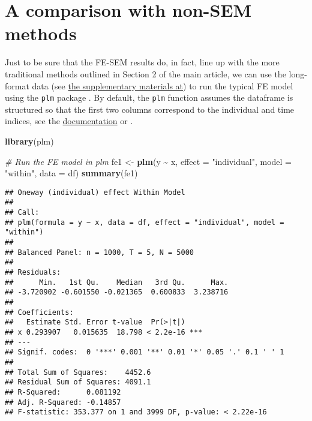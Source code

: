 \documentclass[]{interact}
\theoremstyle{plain}%
\theoremstyle{definition}
\theoremstyle{remark}
\newenvironment{Shaded}{\begin{snugshade}}{\end{snugshade}}
\newcommand{\CommentTok}[1]{\textcolor[rgb]{0.56,0.35,0.01}{\textit{#1}}}
\newcommand{\DataTypeTok}[1]{\textcolor[rgb]{0.13,0.29,0.53}{#1}}
\newcommand{\KeywordTok}[1]{\textcolor[rgb]{0.13,0.29,0.53}{\textbf{#1}}}
\newcommand{\NormalTok}[1]{#1}
\newcommand{\OperatorTok}[1]{\textcolor[rgb]{0.81,0.36,0.00}{\textbf{#1}}}
\newcommand{\StringTok}[1]{\textcolor[rgb]{0.31,0.60,0.02}{#1}}
\begin{document}
\hypertarget{a-comparison-with-non-sem-methods}{%
\section{A comparison with non-SEM
methods}\label{a-comparison-with-non-sem-methods}}

Just to be sure that the FE-SEM results do, in fact, line up with the
more traditional methods outlined in Section 2 of the main article, we
can use the long-format data (see
\href{https://github.com/henrik-andersen/FE-SEM}{the supplementary
materials at}) to run the typical FE model using the \texttt{plm}
package \citep{R-plm_a}. By default, the \texttt{plm} function assumes
the dataframe is structured so that the first two columns correspond to
the individual and time indices, see the
\href{https://cran.r-project.org/web/packages/plm/plm.pdf}{documentation}
or \citet{R-plm_a}.

\singlespacing

\begin{Shaded}
\begin{Highlighting}[]
\KeywordTok{library}\NormalTok{(plm)}

\CommentTok{\# Run the FE model in plm }
\NormalTok{fe1 \textless{}{-}}\StringTok{ }\KeywordTok{plm}\NormalTok{(y }\OperatorTok{\textasciitilde{}}\StringTok{ }\NormalTok{x, }
           \DataTypeTok{effect =} \StringTok{"individual"}\NormalTok{, }\DataTypeTok{model =} \StringTok{"within"}\NormalTok{, }
           \DataTypeTok{data =}\NormalTok{ df)}
\KeywordTok{summary}\NormalTok{(fe1)}
\end{Highlighting}
\end{Shaded}

\begin{verbatim}
## Oneway (individual) effect Within Model
## 
## Call:
## plm(formula = y ~ x, data = df, effect = "individual", model = "within")
## 
## Balanced Panel: n = 1000, T = 5, N = 5000
## 
## Residuals:
##      Min.   1st Qu.    Median   3rd Qu.      Max. 
## -3.720902 -0.601550 -0.021365  0.600833  3.238716 
## 
## Coefficients:
##   Estimate Std. Error t-value  Pr(>|t|)    
## x 0.293907   0.015635  18.798 < 2.2e-16 ***
## ---
## Signif. codes:  0 '***' 0.001 '**' 0.01 '*' 0.05 '.' 0.1 ' ' 1
## 
## Total Sum of Squares:    4452.6
## Residual Sum of Squares: 4091.1
## R-Squared:      0.081192
## Adj. R-Squared: -0.14857
## F-statistic: 353.377 on 1 and 3999 DF, p-value: < 2.22e-16
\end{verbatim}
\end{document}

